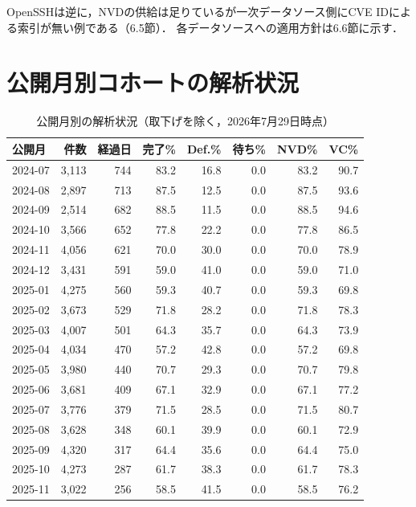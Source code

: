 OpenSSHは逆に，NVDの供給は足りているが一次データソース側にCVE IDによる索引が無い例である（6.5節）．
各データソースへの適用方針は6.6節に示す．

\section{公開月別コホートの解析状況}
\label{app:cohort}

\begin{table}[htbp]
  \caption{公開月別の解析状況（取下げを除く，2026年7月29日時点）}
  \label{tab:cohort}
  \begin{center}
  \small
  \begin{tabular}{lrrrrrrr}
    \hline
    公開月 & 件数 & 経過日 & 完了\% & Def.\% & 待ち\% & NVD\% & VC\% \\
    \hline
    2024-07 & 3,113 & 744 & 83.2 & 16.8 & 0.0 & 83.2 & 90.7 \\
    2024-08 & 2,897 & 713 & 87.5 & 12.5 & 0.0 & 87.5 & 93.6 \\
    2024-09 & 2,514 & 682 & 88.5 & 11.5 & 0.0 & 88.5 & 94.6 \\
    2024-10 & 3,566 & 652 & 77.8 & 22.2 & 0.0 & 77.8 & 86.5 \\
    2024-11 & 4,056 & 621 & 70.0 & 30.0 & 0.0 & 70.0 & 78.9 \\
    2024-12 & 3,431 & 591 & 59.0 & 41.0 & 0.0 & 59.0 & 71.0 \\
    2025-01 & 4,275 & 560 & 59.3 & 40.7 & 0.0 & 59.3 & 69.8 \\
    2025-02 & 3,673 & 529 & 71.8 & 28.2 & 0.0 & 71.8 & 78.3 \\
    2025-03 & 4,007 & 501 & 64.3 & 35.7 & 0.0 & 64.3 & 73.9 \\
    2025-04 & 4,034 & 470 & 57.2 & 42.8 & 0.0 & 57.2 & 69.8 \\
    2025-05 & 3,980 & 440 & 70.7 & 29.3 & 0.0 & 70.7 & 79.8 \\
    2025-06 & 3,681 & 409 & 67.1 & 32.9 & 0.0 & 67.1 & 77.2 \\
    2025-07 & 3,776 & 379 & 71.5 & 28.5 & 0.0 & 71.5 & 80.7 \\
    2025-08 & 3,628 & 348 & 60.1 & 39.9 & 0.0 & 60.1 & 72.9 \\
    2025-09 & 4,320 & 317 & 64.4 & 35.6 & 0.0 & 64.4 & 75.0 \\
    2025-10 & 4,273 & 287 & 61.7 & 38.3 & 0.0 & 61.7 & 78.3 \\
    2025-11 & 3,022 & 256 & 58.5 & 41.5 & 0.0 & 58.5 & 76.2 \\

\end{tabular}
\end{center}
\end{table}
